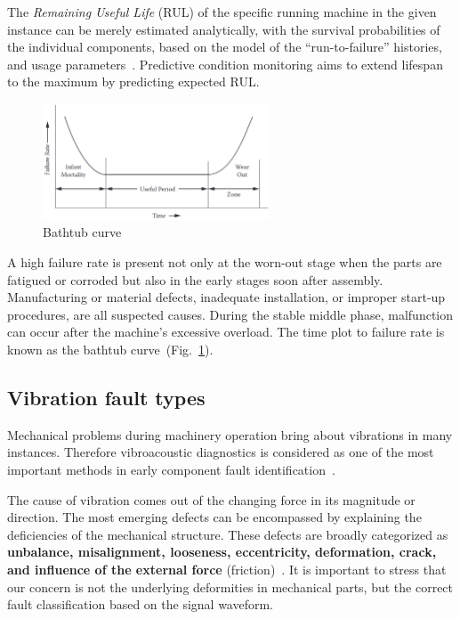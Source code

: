 The \emph{Remaining Useful Life} (RUL) of the specific running machine in the given instance can be merely estimated analytically, with the survival probabilities of the individual components, based on the model of the ``run-to-failure'' histories, and usage parameters~\cite{okoh_overview_2014}. Predictive condition monitoring aims to extend lifespan to the maximum by predicting expected RUL.

\begin{figure}[ht]
	\centering
	\includegraphics[width=0.6\textwidth]{assets/analysis/bath-tub-curve.png}
	\caption{Bathtub curve~\cite{mohanty_machinery_2015}}
	\label{fig:bathtub-curve}
\end{figure}

A high failure rate is present not only at the worn-out stage when the parts are fatigued or corroded but also in the early stages soon after assembly. Manufacturing or material defects, inadequate installation, or improper start-up procedures, are all suspected causes. During the stable middle phase, malfunction can occur after the machine's excessive overload. The time plot to failure rate is known as the bathtub curve~(Fig.~\ref{fig:bathtub-curve}).

\subsection{Vibration fault types}
Mechanical problems during machinery operation bring about vibrations in many instances. Therefore vibroacoustic diagnostics is considered as one of the most important methods in early component fault identification~\cite{ziaran_technicka_2013}.

The cause of vibration comes out of the changing force in its magnitude or direction. The most emerging defects can be encompassed by explaining the deficiencies of the mechanical structure. These defects are broadly categorized as \textbf{unbalance, misalignment, looseness, eccentricity, deformation, crack, and influence of the external force} (friction)~\cite{davies_handbook_2012}. It is important to stress that our concern is not the underlying deformities in mechanical parts, but the correct fault classification based on the signal waveform.

